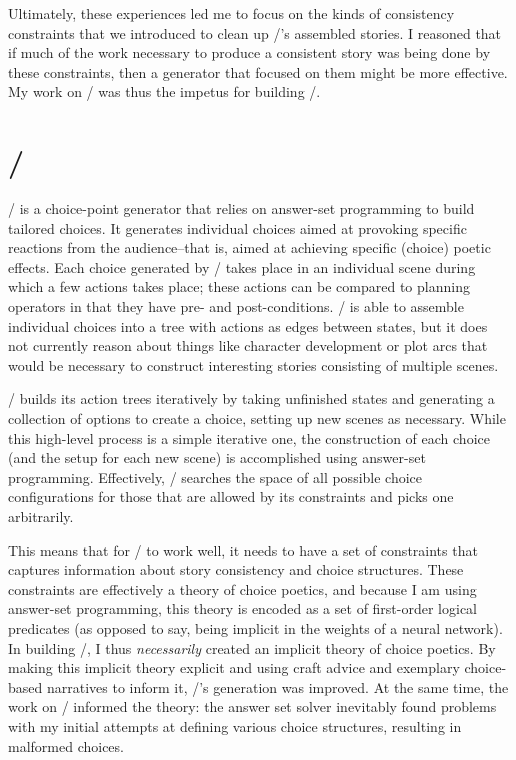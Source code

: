 Ultimately, these experiences led me to focus on the kinds of consistency constraints that we introduced to clean up \skald/'s assembled stories.
%
I reasoned that if much of the work necessary to produce a consistent story was being done by these constraints, then a generator that focused on them might be more effective. 
%
My work on \skald/ was thus the impetus for building \dunyazad/.



\section{\dunyazad/}

\dunyazad/ is a choice-point generator that relies on answer-set programming to build tailored choices.
%
It generates individual choices aimed at provoking specific reactions from the audience--that is, aimed at achieving specific (choice) poetic effects.
%
Each choice generated by \dunyazad/ takes place in an individual scene during which a few actions takes place; these actions can be compared to planning operators in that they have pre- and post-conditions.
%
\dunyazad/ is able to assemble individual choices into a tree with actions as edges between states, but it does not currently reason about things like character development or plot arcs that would be necessary to construct interesting stories consisting of multiple scenes.


\dunyazad/ builds its action trees iteratively by taking unfinished states and generating a collection of options to create a choice, setting up new scenes as necessary.
%
While this high-level process is a simple iterative one, the construction of each choice (and the setup for each new scene) is accomplished using answer-set programming.
%
Effectively, \dunyazad/ searches the space of all possible choice configurations for those that are allowed by its constraints and picks one arbitrarily.


This means that for \dunyazad/ to work well, it needs to have a set of constraints that captures information about story consistency and choice structures.
%
These constraints are effectively a theory of choice poetics, and because I am using answer-set programming, this theory is encoded as a set of first-order logical predicates (as opposed to say, being implicit in the weights of a neural network).
%
In building \dunyazad/, I thus \emph{necessarily} created an implicit theory of choice poetics.
%
By making this implicit theory explicit and using craft advice and exemplary choice-based narratives to inform it, \dunyazad/'s generation was improved.
%
At the same time, the work on \dunyazad/ informed the theory: the answer set solver inevitably found problems with my initial attempts at defining various choice structures, resulting in malformed choices.


